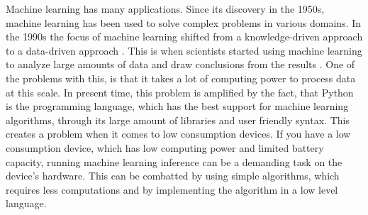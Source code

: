 Machine learning has many applications. Since its discovery in the 1950s, machine learning has been used to solve complex problems in various domains. In the 1990s the focus of machine learning shifted from a knowledge-driven approach to a data-driven approach \cite{marr2016short}. This is when scientists started using machine learning to analyze large amounts of data and draw conclusions from the results \cite{marr2016short}. One of the problems with this, is that it takes a lot of computing power to process data at this scale. In present time, this problem is amplified by the fact, that Python is the programming language, which has the best support for machine learning algorithms, through its large amount of libraries and user friendly syntax. This creates a problem when it comes to low consumption devices. If you have a low consumption device, which has low computing power and limited battery capacity, running machine learning inference can be a demanding task on the device's hardware. This can be combatted by using simple algorithms, which requires less computations and by implementing the algorithm in a low level language.